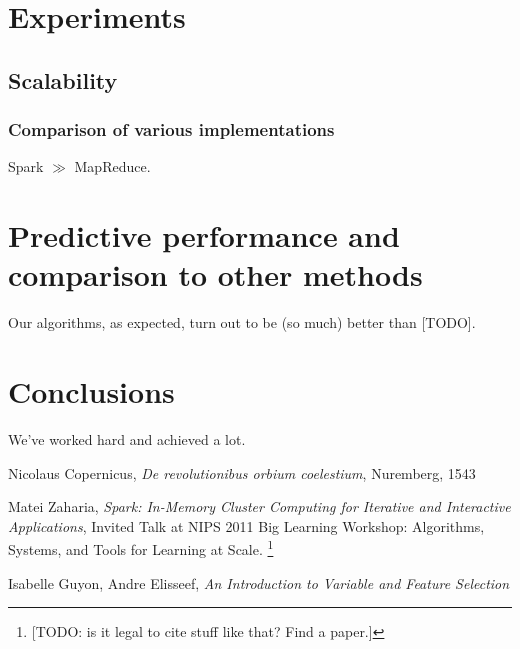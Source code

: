 \documentclass[12pt]{report}
\begin{document}
\chapter{Experiments}
\label{chap:experiments}

\section{Scalability}
\subsection{Comparison of various implementations}

Spark $\gg$ MapReduce.

\chapter{Predictive performance and comparison to other methods}

Our algorithms, as expected, turn out to be (so much) better than [TODO].

\chapter{Conclusions}

We've worked hard and achieved a lot.

\begin{thebibliography}{9}

 Nicolaus Copernicus, \emph{De revolutionibus orbium coelestium},
                     Nuremberg, 1543

 Matei Zaharia, \emph{Spark: In-Memory Cluster Computing for Iterative and
                  Interactive Applications}, Invited Talk at NIPS 2011 Big Learning
                  Workshop: Algorithms, Systems, and Tools for Learning at Scale.
                  \footnote{[TODO: is it legal to cite stuff like that? Find a paper.]}
                  
 Isabelle Guyon, Andre Elisseef, \emph{An Introduction to Variable and
                Feature Selection}

\end{thebibliography}
\end{document}
